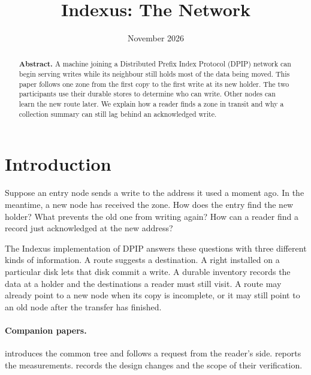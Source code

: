 \documentclass[11pt]{article}
\begin{document}
\title{Indexus: The Network}
\author{\ixbyline}
\date{November 2026}
\maketitle

\begin{abstract}
\noindent \textbf{Abstract. }A machine joining a Distributed Prefix Index Protocol (DPIP) network can begin serving writes while its neighbour still holds most of the data being moved. This paper follows one zone from the first copy to the first write at its new holder. The two participants use their durable stores to determine who can write. Other nodes can learn the new route later. We explain how a reader finds a zone in transit and why a collection summary can still lag behind an acknowledged write.
\vspace{1em}\end{abstract}

\section{Introduction}
Suppose an entry node sends a write to the address it used a moment ago. In the meantime, a new node has received the zone. How does the entry find the new holder? What prevents the old one from writing again? How can a reader find a record just acknowledged at the new address?

The Indexus implementation of DPIP answers these questions with three different kinds of information. A route suggests a destination. A right installed on a particular disk lets that disk commit a write. A durable inventory records the data at a holder and the destinations a reader must still visit. A route may already point to a new node when its copy is incomplete, or it may still point to an old node after the transfer has finished.

\paragraph{Companion papers.}
 introduces the common tree and  follows a request from the reader's side.  reports the measurements.  records the design changes and the scope of their verification.
\end{document}
